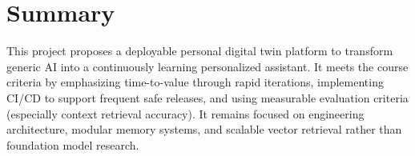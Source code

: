 \documentclass[11pt,a4paper]{article}
\begin{document}
\section{Summary}
This project proposes a deployable personal digital twin platform to transform generic AI into a continuously learning personalized assistant. It meets the course criteria by emphasizing time-to-value through rapid iterations, implementing CI/CD to support frequent safe releases, and using measurable evaluation criteria (especially context retrieval accuracy). It remains focused on engineering architecture, modular memory systems, and scalable vector retrieval rather than foundation model research.
\end{document}
